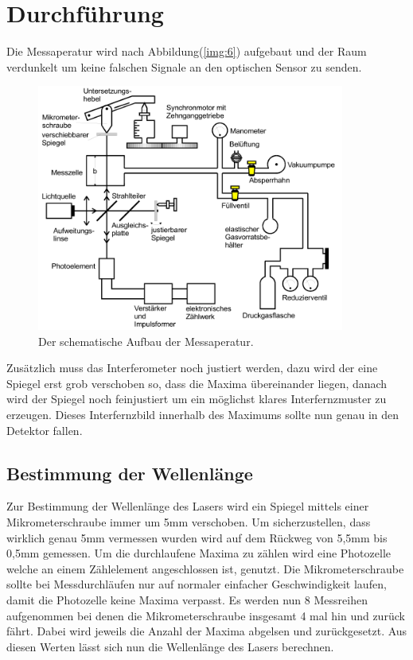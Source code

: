 \section{Durchführung}

    \noindent Die Messaperatur wird nach Abbildung(\ref{img:6}) aufgebaut und der Raum verdunkelt um keine falschen Signale an den optischen 
    Sensor zu senden.
    
    \begin{figure}[ht]
        \centering
        \includegraphics[width=0.9\textwidth]{latex/images/MessApp.PNG}
        \caption{Der schematische Aufbau der Messaperatur\protect \cite{V401}.}
        \label{img:4}
    \end{figure}

    \noindent Zusätzlich muss das Interferometer noch justiert werden, dazu wird der eine Spiegel erst grob verschoben so, dass die Maxima 
    übereinander liegen, danach wird der Spiegel noch feinjustiert um ein möglichst klares Interfernzmuster zu erzeugen. Dieses Interfernzbild 
    innerhalb des Maximums sollte nun genau in den Detektor fallen.

    \subsection{Bestimmung der Wellenlänge}

        \noindent Zur Bestimmung der Wellenlänge des Lasers wird ein Spiegel mittels einer Mikrometerschraube immer um 5mm verschoben. Um 
        sicherzustellen, dass wirklich genau 5mm vermessen wurden wird auf dem Rückweg von 5,5mm bis 0,5mm gemessen. Um die durchlaufene 
        Maxima zu zählen wird eine Photozelle welche an einem Zählelement angeschlossen ist, genutzt. Die Mikrometerschraube sollte bei 
        Messdurchläufen nur auf normaler einfacher Geschwindigkeit laufen, damit die Photozelle keine Maxima verpasst. Es werden nun 8 Messreihen 
        aufgenommen bei denen die Mikrometerschraube insgesamt 4 mal hin und zurück fährt. Dabei wird jeweils die Anzahl der Maxima abgelsen und 
        zurückgesetzt. Aus diesen Werten lässt sich nun die Wellenlänge des Lasers berechnen.

